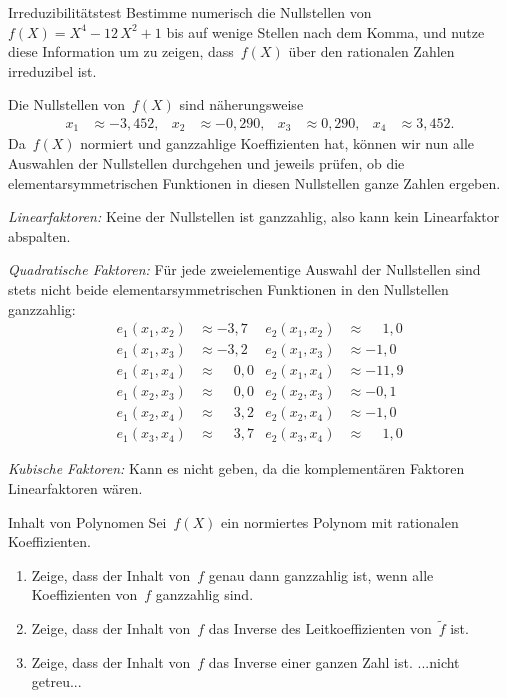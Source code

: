 \documentclass{algblatt}
\begin{document}
\vspace*{-1.5cm}

\begin{aufgabe}{Irreduzibilitätstest}
Bestimme numerisch die Nullstellen von~$f(X) = X^4 - 12\,X^2 + 1$ bis auf
wenige Stellen nach dem Komma, und nutze diese Information um zu zeigen,
dass~$f(X)$ über den rationalen Zahlen irreduzibel ist.

\begin{loesung}
Die Nullstellen von~$f(X)$ sind näherungsweise
\begin{align*}
  x_1 &\approx -3{,}452, &
  x_2 &\approx -0{,}290, &
  x_3 &\approx 0{,}290, &
  x_4 &\approx 3{,}452.
\end{align*}
Da~$f(X)$ normiert und ganzzahlige Koeffizienten hat, können wir nun alle
Auswahlen der Nullstellen durchgehen und jeweils prüfen, ob die
elementarsymmetrischen Funktionen in diesen Nullstellen ganze Zahlen ergeben.

\emph{Linearfaktoren:} Keine der Nullstellen ist ganzzahlig, also kann kein
Linearfaktor abspalten.

\emph{Quadratische Faktoren:} Für jede zweielementige Auswahl der Nullstellen
sind stets nicht beide elementarsymmetrischen Funktionen in den Nullstellen
ganzzahlig:
\begin{align*}
  e_1(x_1,x_2) &\approx -3{,}7 &
  e_2(x_1,x_2) &\approx \phantom{+}1{,}0 \\
  e_1(x_1,x_3) &\approx -3{,}2 &
  e_2(x_1,x_3) &\approx -1{,}0 \\
  e_1(x_1,x_4) &\approx \phantom{+}0{,}0 &
  e_2(x_1,x_4) &\approx -11{,}9 \\
  e_1(x_2,x_3) &\approx \phantom{+}0{,}0 &
  e_2(x_2,x_3) &\approx -0{,}1 \\
  e_1(x_2,x_4) &\approx \phantom{+}3{,}2 &
  e_2(x_2,x_4) &\approx -1{,}0 \\
  e_1(x_3,x_4) &\approx \phantom{+}3{,}7 &
  e_2(x_3,x_4) &\approx \phantom{+}1{,}0
\end{align*}

\emph{Kubische Faktoren:} Kann es nicht geben, da die komplementären Faktoren
Linearfaktoren wären.
\end{loesung}
\end{aufgabe}

\begin{aufgabe}{Inhalt von Polynomen}
Sei~$f(X)$ ein normiertes Polynom mit rationalen Koeffizienten.
\begin{enumerate}
\item Zeige, dass der Inhalt von~$f$ genau dann ganzzahlig ist, wenn alle
Koeffizienten von~$f$ ganzzahlig sind.
\item Zeige, dass der Inhalt von~$f$ das Inverse des Leitkoeffizienten
von~$\widetilde f$ ist.
\item Zeige, dass der Inhalt von~$f$ das Inverse einer ganzen Zahl ist.
...nicht getreu...
\end{enumerate}
\end{aufgabe}
\end{document}
